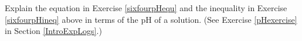 {Explain the equation in Exercise \ref{sixfourpHequ} and the inequality in Exercise \ref{sixfourpHineq} above in terms of the pH of a solution.  (See Exercise \ref{pHexercise} in Section \ref{IntroExpLogs}.)}
{}